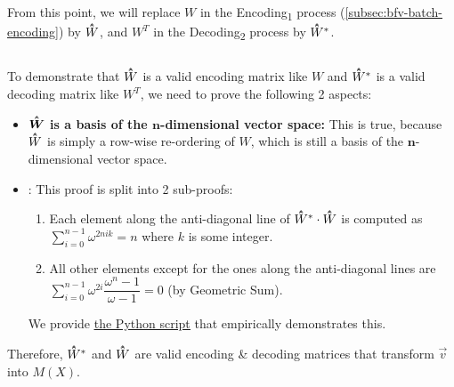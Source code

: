 $ $

$ $

From this point, we will replace $W$ in the \textsf{Encoding\textsubscript{1}} process (\autoref{subsec:bfv-batch-encoding}) by $\hathat{W}$, and $W^T$ in the \textsf{Decoding\textsubscript{2}} process by $\hathat{W}^*$. 

$ $

To demonstrate that $\hathat{W}$ is a valid encoding matrix like $W$ and $\hathat{W}^*$ is a valid decoding matrix like $W^T$, we need to prove the following 2 aspects:
\begin{itemize}[leftmargin=3\parindent]

\item \textbf{${\hathat{\bm W}}$ is a basis of the $\bm{n}$-dimensional vector space:} This is true, because $\hathat{W}$ is simply a row-wise re-ordering of $W$, which is still a basis of the $\bm{n}$-dimensional vector space.

\item {}: This proof is split into 2 sub-proofs: 
\begin{enumerate}[leftmargin=2\parindent]
\item {} Each element along the anti-diagonal line of \boldmath$\hathat{ W}^{ *} \cdot \hathat{ W}$ is computed as $\sum\limits_{i=0}^{n-1} \omega^{2nik} = n$ where $k$ is some integer.
\item {} All other elements except for the ones along the anti-diagonal lines are $\sum\limits_{i=0}^{n-1}\omega^{2i} \dfrac{\omega^n - 1}{\omega - 1} = 0$ (by Geometric Sum). 
\end{enumerate}

We provide \href{https://github.com/gogo9th/fhe-textbook/blob/main/source%20code/bfv_j_matrix_inverse_proof.py}{\underline{the Python script}} that empirically demonstrates this. 

\end{itemize}




Therefore, $\hathat{W}^*$ and $\hathat{W}$ are valid encoding \& decoding matrices that transform $\vec{v}$ into $M(X)$. 

$ $

